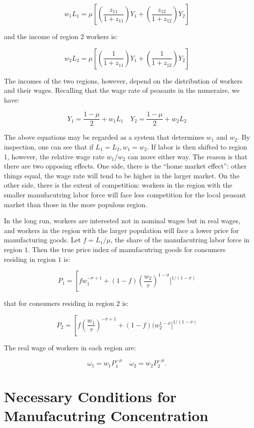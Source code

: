 \begin{equation}
  w_1 L_1 = \mu \left[ (\frac{z_{11}}{1 + z_{11}})Y_1 + (\frac{z_{12}}{1 + z_{12}})Y_2 \right]
\end{equation}

and the income of region $2$ workers is:

\begin{equation}
  w_2 L_2 = \mu \left[ (\frac{1}{1 + z_{11}})Y_1 + (\frac{1}{1 + z_{12}})Y_2 \right]
\end{equation}

The incomes of the two regions, however, depend on the distribution of workers and their wages. Recalling that the wage rate of peasants in the numeraire, we have:

\begin{equation}
  Y_1 = \frac{1 - \mu}{2} + w_1 L_1 \quad Y_2 = \frac{1 - \mu}{2} + w_2 L_2
\end{equation}

The above equations may be regarded as a system that determines $w_1$ and $w_2$. By inspection, one can see that if $L_1 = L_2, w_1 = w_2$. If labor is then shifted to region $1$, however, the relative wage rate $w_1 / w_2$ can move either way. The reason is that there are two opposing effects. One side, there is the ``home market effect'': other things equal, the wage rate will tend to be higher in the larger market. On the other side, there is the extent of competition: workers in the region with the smaller manufacutring labor force will face less competition for the local peasant market than those in the more populous region. 

In the long run, workers are interested not in nominal wages but in real wages, and workers in the region with the larger population will face a lower price for manufacturing goods. Let $f = L_1 / \mu$, the share of the manufacutring labor force in region $1$. Then the true price index of manufacutring goods for consumers residing in region $1$ is:

\begin{equation}
  P_1 = \left[f w_1^{-\sigma + 1} + (1 - f)(\frac{w_2}{\tau})^{1 - \sigma}]^{1/(1 - \sigma)}
  \end{equation}

that for consumers residing in region $2$ is:

\begin{equation}
  P_2 = \left[f (\frac{w_1}{\tau})^{-\sigma + 1} + (1 - f)(w_2^{1 - \sigma}]^{1/(1 - \sigma)}
\end{equation}

The real wage of workers in each region are:

\begin{equation}
  \omega_1 = w_1 P_1^{-\mu} \quad \omega_2 = w_2 P_2^{-\mu}.
\end{equation}

\section{Necessary Conditions for Manufacutring Concentration}

